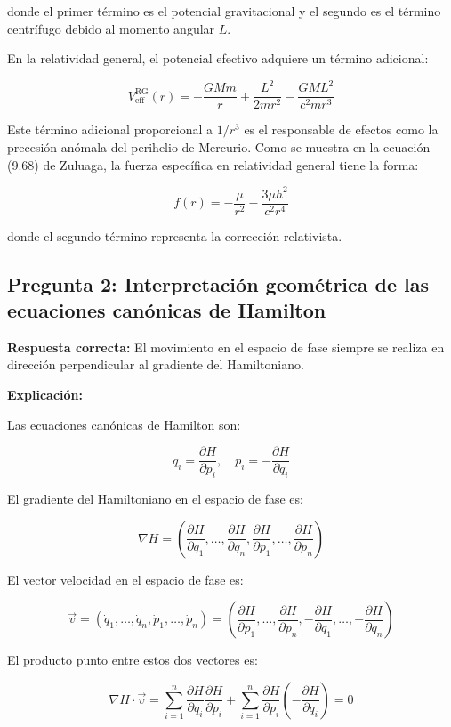 \documentclass[a4paper]{article}
\begin{document}
donde el primer término es el potencial gravitacional y el segundo es el término centrífugo debido al momento angular $L$.

En la relatividad general, el potencial efectivo adquiere un término adicional:

$$V_{\text{eff}}^{\text{RG}}(r) = -\frac{GMm}{r} + \frac{L^2}{2mr^2} - \frac{GML^2}{c^2mr^3}$$

Este término adicional proporcional a $1/r^3$ es el responsable de efectos como la precesión anómala del perihelio de Mercurio. Como se muestra en la ecuación (9.68) de Zuluaga, la fuerza específica en relatividad general tiene la forma:

$$f(r) = -\frac{\mu}{r^2} - \frac{3\mu h^2}{c^2 r^4}$$

donde el segundo término representa la corrección relativista.

\subsection*{Pregunta 2: Interpretación geométrica de las ecuaciones canónicas de Hamilton}

\textbf{Respuesta correcta:} El movimiento en el espacio de fase siempre se realiza en dirección perpendicular al gradiente del Hamiltoniano.

\textbf{Explicación:}

Las ecuaciones canónicas de Hamilton son:

$$\dot{q}_i = \frac{\partial H}{\partial p_i}, \quad \dot{p}_i = -\frac{\partial H}{\partial q_i}$$

El gradiente del Hamiltoniano en el espacio de fase es:

$$\nabla H = \left(\frac{\partial H}{\partial q_1}, \ldots, \frac{\partial H}{\partial q_n}, \frac{\partial H}{\partial p_1}, \ldots, \frac{\partial H}{\partial p_n}\right)$$

El vector velocidad en el espacio de fase es:

$$\vec{v} = (\dot{q}_1, \ldots, \dot{q}_n, \dot{p}_1, \ldots, \dot{p}_n) = \left(\frac{\partial H}{\partial p_1}, \ldots, \frac{\partial H}{\partial p_n}, -\frac{\partial H}{\partial q_1}, \ldots, -\frac{\partial H}{\partial q_n}\right)$$

El producto punto entre estos dos vectores es:

$$\nabla H \cdot \vec{v} = \sum_{i=1}^n \frac{\partial H}{\partial q_i}\frac{\partial H}{\partial p_i} + \sum_{i=1}^n \frac{\partial H}{\partial p_i}\left(-\frac{\partial H}{\partial q_i}\right) = 0$$
\end{document}
